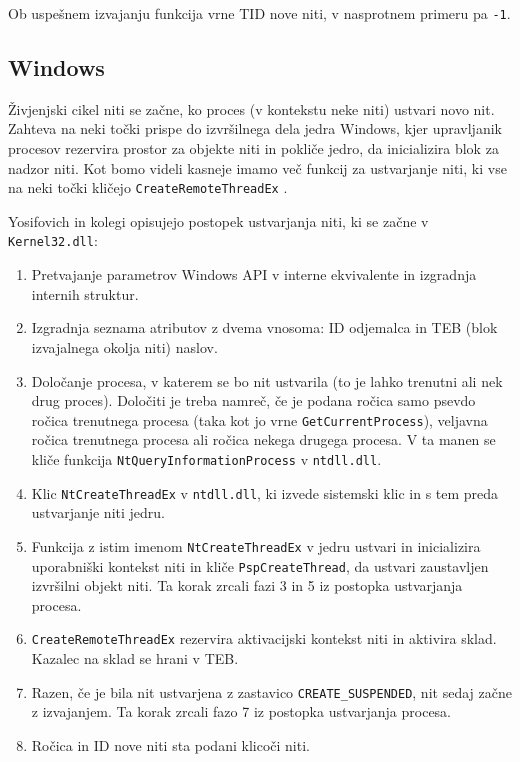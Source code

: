 \documentclass[a4paper,12pt,openright]{book}
\begin{document}
Ob uspešnem izvajanju funkcija vrne TID nove niti, v nasprotnem primeru pa \texttt{-1}.

\subsection{Windows}

Živjenjski cikel niti se začne, ko proces (v kontekstu neke niti) ustvari novo nit.
Zahteva na neki točki prispe do izvršilnega dela jedra Windows, kjer upravljanik procesov rezervira prostor za objekte niti in pokliče jedro, da inicializira blok za nadzor niti.
Kot bomo videli kasneje imamo več funkcij za ustvarjanje niti, ki vse na neki točki kličejo \texttt{CreateRemoteThreadEx} \cite{Yosifovich_Russinovich_Solomon_Ionescu_2017}.

Yosifovich in kolegi \cite{Yosifovich_Russinovich_Solomon_Ionescu_2017} opisujejo postopek ustvarjanja niti, ki se začne v \texttt{Kernel32.dll}:
\begin{enumerate}
	\item Pretvajanje parametrov Windows API v interne ekvivalente in izgradnja internih struktur.
	\item Izgradnja seznama atributov z dvema vnosoma: ID odjemalca in TEB (blok izvajalnega okolja niti) naslov.
	\item Določanje procesa, v katerem se bo nit ustvarila (to je lahko trenutni ali nek drug proces). 
	      Določiti je treba namreč, če je podana ročica samo psevdo ročica trenutnega procesa (taka kot jo vrne \texttt{GetCurrentProcess}), veljavna ročica trenutnega procesa ali ročica nekega drugega procesa.
	      V ta manen se kliče funkcija \texttt{NtQueryInformationProcess} v \texttt{ntdll.dll}.
	\item Klic \texttt{NtCreateThreadEx} v \texttt{ntdll.dll}, ki izvede sistemski klic in s tem preda ustvarjanje niti jedru.
	\item Funkcija z istim imenom \texttt{NtCreateThreadEx} v jedru ustvari in inicializira uporabniški kontekst niti in kliče \texttt{PspCreateThread}, da ustvari zaustavljen izvršilni objekt niti.
	      Ta korak zrcali fazi 3 in 5 iz postopka ustvarjanja procesa.
	\item \texttt{CreateRemoteThreadEx} rezervira aktivacijski kontekst niti in aktivira sklad.
	      Kazalec na sklad se hrani v TEB.
	\item Razen, če je bila nit ustvarjena z zastavico \texttt{CREATE\_SUSPENDED}, nit sedaj začne z izvajanjem.
	      Ta korak zrcali fazo 7 iz postopka ustvarjanja procesa.
	\item Ročica in ID nove niti sta podani klicoči niti.
\end{enumerate}
\end{document}
